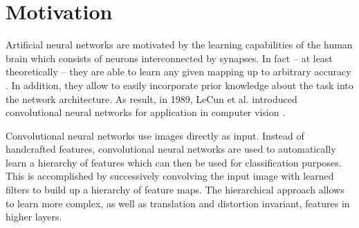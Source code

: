 \section{Motivation}

Artificial neural networks are motivated by the learning capabilities of the human brain which consists of neurons interconnected by synapses. In fact -- at least theoretically -- they are able to learn any given mapping up to arbitrary accuracy \cite{HornikStinchcombeWhite:1989}. In addition, they allow to easily incorporate prior knowledge about the task into the network architecture. As result, in 1989, LeCun et al. introduced convolutional neural networks for application in computer vision \cite{LeCunBoserDenkerHenderson:1989}.

Convolutional neural networks use images directly as input. Instead of handcrafted features, convolutional neural networks are used to automatically learn a hierarchy of features which can then be used for classification purposes. This is accomplished by successively convolving the input image with learned filters to build up a hierarchy of feature maps. The hierarchical approach allows to learn more complex, as well as translation and distortion invariant, features in higher layers.



